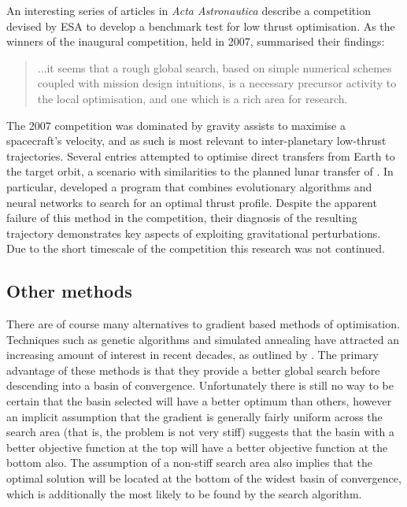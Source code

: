 An interesting series of articles in \emph{Acta Astronautica} describe a competition devised by ESA to develop a benchmark test for low thrust optimisation. As the winners of the inaugural competition, held in 2007, \textcite{Petropoulos2007} summarised their findings: 

\begin{quotation}...it seems that a rough global search, based on simple numerical schemes coupled with mission design intuitions, is a necessary precursor activity to the local optimisation, and one which is a rich area for research.\end{quotation}

The 2007 competition was dominated by gravity assists to maximise a spacecraft's velocity, and as such is most relevant to inter-planetary low-thrust trajectories. Several entries attempted to optimise direct transfers from Earth to the target orbit, a scenario with similarities to the planned lunar transfer of \BW. In particular, \textcite{Dachwald2007} developed a program that combines evolutionary algorithms and neural networks to search for an optimal thrust profile. Despite the apparent failure of this method in the competition, their diagnosis of the resulting trajectory demonstrates key aspects of exploiting gravitational perturbations. Due to the short timescale of the competition this research was not continued.






\subsection{Other methods} \label{sub:Other-lit}

There are of course many alternatives to gradient based methods of optimisation. Techniques such as genetic algorithms and simulated annealing have attracted an increasing amount of interest in recent decades, as outlined by \textcite{Ren2007}. The primary advantage of these methods is that they provide a better global search before descending into a basin of convergence. Unfortunately there is still no way to be certain that the basin selected will have a better optimum than others, however an implicit assumption that the gradient is generally fairly uniform across the search area (that is, the problem is not very stiff) suggests that the basin with a better objective function at the top will have a better objective function at the bottom also. The assumption of a non-stiff search area also implies that the optimal solution will be located at the bottom of the widest basin of convergence, which is additionally the most likely to be found by the search algorithm.

